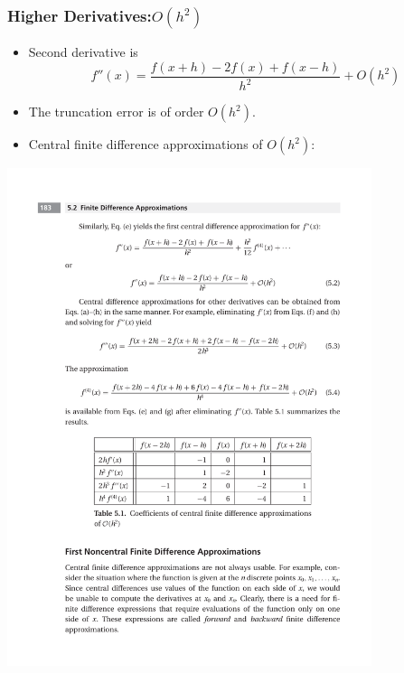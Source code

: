 \documentclass{beamer}
\begin{document}
\begin{frame}[fragile]
\frametitle{Higher Derivatives:$O(h^2)$}

\begin{itemize}
\item Second derivative is 
\[
f''(x)=\frac{f(x+h)-2f(x)+f(x-h)}{h^2}+O(h^2)
\]
\item The truncation error is of order $O(h^2)$.
\item Central finite difference approximations of $O(h^2)$:
\end{itemize}
\centerline{\includegraphics[width=0.8\textwidth]{Lec9_Tab3}}

\end{frame}
\end{document}
